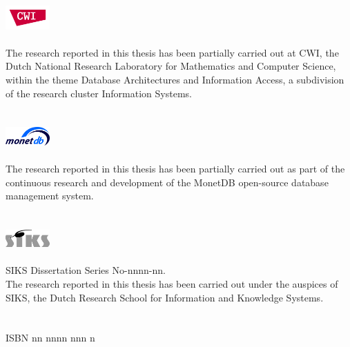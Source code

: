 \documentclass[11pt, oneside]{Thesis} %
\begin{document}
\pagestyle{fancy} %

\includegraphics[width=1.7cm]{Figures/CWIlogo}
\\
\\
{The research reported in this thesis has been partially carried out at CWI,
the Dutch National Research Laboratory for Mathematics 
and Computer Science, within the theme Database Architectures and Information Access, 
a subdivision of the research cluster Information Systems.}
\\
\\
\\
\includegraphics[width=1.7cm]{Figures/monetdb_logo}
\\
\\
{The research reported in this thesis has been partially carried out as part of the continuous research and development of the MonetDB
open-source database management system.}
\\
\\
\\
\includegraphics[width=1.7cm]{Figures/siks_logo.eps}
\\
\\
{SIKS Dissertation Series No-nnnn-nn.\\
The research reported in this thesis has been carried out under the auspices 
of SIKS, the Dutch Research School for Information and Knowledge Systems.}
\\
\\
\\
ISBN nn nnnn nnn n
\clearpage 


\pagestyle{empty} %
\clearpage %
\end{document}
